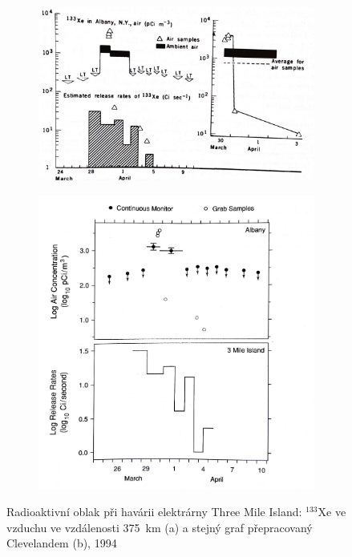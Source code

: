 \documentclass[12pt,]{article}
\begin{document}
\begin{figure}[H]
  \begin{subfigure}{0.57\textwidth}
  \centering
    \vspace*{0.65cm}
      \includegraphics[width=\textwidth]{fig/cleveland_xenon_133}
      \vspace*{0.2cm}
      \caption{}
      \label{fig07a}
  \end{subfigure}%
  \begin{subfigure}[H]{0.43\textwidth}
  \centering
      \includegraphics[width=\textwidth]{fig/cleveland_xenon_opr}
      \vspace*{-0.8cm}
      \caption{}
      \label{fig07b}
  \end{subfigure}
\vspace*{-0.25cm}
\caption{Radioaktivní oblak při havárii elektrárny Three Mile Island: ${}^{133}\mbox{Xe}$ ve vzduchu ve vzdálenosti \SI{375}{\kilo\meter} (a) a stejný graf přepracovaný Clevelandem (b), 1994} 
\label{fig07}
\end{figure}
\end{document}
